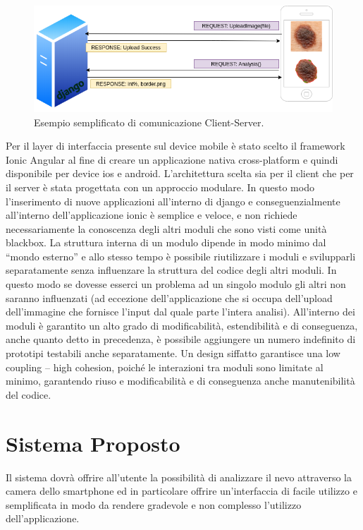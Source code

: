 {\begin{figure}[h]
	\begin{center}
		\includegraphics[scale=0.5]{figure/capitolo4/esempioarch.png}
	\end{center}
	\caption{Esempio semplificato di comunicazione Client-Server.}
\end{figure}
Per il layer di interfaccia presente sul device mobile è stato scelto il framework Ionic Angular al fine di creare un applicazione nativa cross-platform e quindi disponibile per device ios e android.
\newpage
L'architettura scelta sia per il client che per il server è stata progettata con un approccio modulare.
In questo modo l'inserimento di nuove applicazioni all'interno di django e conseguenzialmente all'interno dell'applicazione ionic è semplice e veloce, e non richiede necessariamente la conoscenza degli altri moduli che sono visti come unità blackbox.
La struttura interna di un modulo dipende in modo minimo dal “mondo esterno” e allo stesso tempo è possibile riutilizzare i moduli e svilupparli separatamente senza influenzare la struttura del codice degli altri moduli.
In questo modo se dovesse esserci un problema ad un singolo modulo gli altri non saranno influenzati (ad eccezione dell'applicazione che si occupa dell'upload dell'immagine che fornisce l'input dal quale parte l'intera analisi).
All'interno dei moduli è garantito un alto grado di modificabilità, estendibilità e di conseguenza, anche quanto detto in precedenza, è possibile aggiungere un numero indefinito di prototipi testabili anche separatamente.
\newline
Un design siffatto garantisce una low coupling – high cohesion, poiché le interazioni tra moduli sono limitate al minimo, garantendo riuso e modificabilità e di conseguenza anche manutenibilità del codice.
\newpage
\section{Sistema Proposto}
Il sistema dovrà offrire all'utente la possibilità di analizzare il nevo attraverso la camera dello smartphone ed in particolare offrire un'interfaccia di facile utilizzo e semplificata in modo da rendere gradevole e non complesso l'utilizzo dell'applicazione.
}
